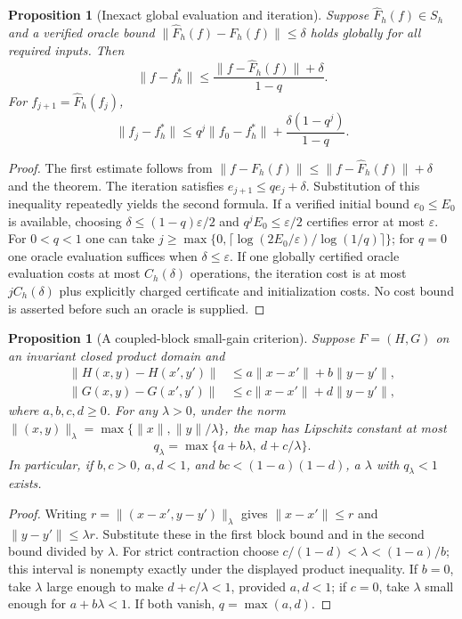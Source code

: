 \documentclass[11pt,a4paper]{article}
\newtheorem{proposition}[theorem]{Proposition}
\theoremstyle{definition}
\begin{document}
\begin{proposition}[Inexact global evaluation and iteration]
Suppose $\widehat F_h(f)\in S_h$ and a verified oracle bound
$\|\widehat F_h(f)-F_h(f)\|\le\delta$ holds globally for all required inputs. Then
\[
 \|f-f_h^*\|\le\frac{\|f-\widehat F_h(f)\|+\delta}{1-q}.
\]
For $f_{j+1}=\widehat F_h(f_j)$,
\[
 \|f_j-f_h^*\|\le q^j\|f_0-f_h^*\|
                         +\frac{\delta(1-q^j)}{1-q}.
\]
\end{proposition}
\begin{proof}
The first estimate follows from
$\|f-F_h(f)\|\le\|f-\widehat F_h(f)\|+\delta$
and the theorem. The iteration satisfies $e_{j+1}\le q e_j+\delta$. Substitution of this inequality repeatedly yields the second formula. If a verified initial bound $e_0\le E_0$ is available, choosing $\delta\le(1-q)\varepsilon/2$ and $q^jE_0\le\varepsilon/2$ certifies error at most $\varepsilon$. For $0<q<1$ one can take
$j\ge\max\{0,\lceil\log(2E_0/\varepsilon)/\log(1/q)\rceil\}$; for $q=0$ one oracle evaluation suffices when $\delta\le\varepsilon$. If one globally certified oracle evaluation costs at most $C_h(\delta)$ operations, the iteration cost is at most $jC_h(\delta)$ plus explicitly charged certificate and initialization costs. No cost bound is asserted before such an oracle is supplied.
\end{proof}

\begin{proposition}[A coupled-block small-gain criterion]
Suppose $F=(H,G)$ on an invariant closed product domain and
\begin{align*}
 \|H(x,y)-H(x',y')\|&\le a\|x-x'\|+b\|y-y'\|,\\
 \|G(x,y)-G(x',y')\|&\le c\|x-x'\|+d\|y-y'\|,
\end{align*}
where $a,b,c,d\ge0$. For any $\lambda>0$, under the norm
$\|(x,y)\|_\lambda=\max\{\|x\|,\|y\|/\lambda\}$, the map has Lipschitz constant at most
\[
 q_\lambda=\max\{a+b\lambda,\ d+c/\lambda\}.
\]
In particular, if $b,c>0$, $a,d<1$, and $bc<(1-a)(1-d)$, a $\lambda$ with $q_\lambda<1$ exists.
\end{proposition}
\begin{proof}
Writing $r=\|(x-x',y-y')\|_\lambda$ gives $\|x-x'\|\le r$ and $\|y-y'\|\le\lambda r$. Substitute these in the first block bound and in the second bound divided by $\lambda$. For strict contraction choose
$c/(1-d)<\lambda<(1-a)/b$; this interval is nonempty exactly under the displayed product inequality. If $b=0$, take $\lambda$ large enough to make $d+c/\lambda<1$, provided $a,d<1$; if $c=0$, take $\lambda$ small enough for $a+b\lambda<1$. If both vanish, $q=\max(a,d)$.
\end{proof}
\end{document}
